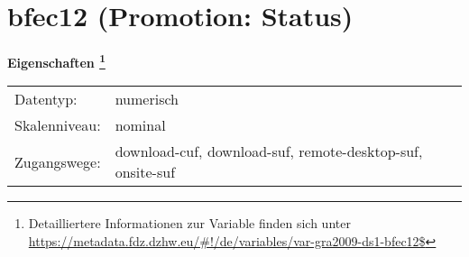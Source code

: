 
    \setcounter{footnote}{0}

    \vspace*{-1.8cm}
	\section{bfec12 (Promotion: Status)}
	\label{section:bfec12}



    \vspace*{0.5cm}
    \noindent\textbf{Eigenschaften
	\footnote{Detailliertere Informationen zur Variable finden sich unter
		\url{https://metadata.fdz.dzhw.eu/\#!/de/variables/var-gra2009-ds1-bfec12$}}}\\
	\begin{tabularx}{\hsize}{@{}lX}
	Datentyp: & numerisch \\
	Skalenniveau: & nominal \\
	Zugangswege: &
	  download-cuf, 
	  download-suf, 
	  remote-desktop-suf, 
	  onsite-suf
 \\
    \end{tabularx}



